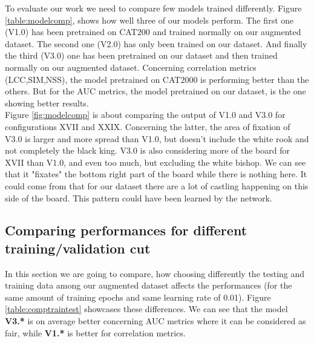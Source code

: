 To evaluate our work we need to compare few models trained differently. Figure \ref{table:modelcomp}, shows how well three of our models perform.
The first one (V1.0) has been pretrained on CAT200 and trained normally on our augmented dataset. The second one (V2.0) has only been trained on our dataset. And finally the third (V3.0) one has been pretrained on our dataset and then trained normally on our augmented dataset. Concerning correlation metrics (LCC,SIM,NSS), the model pretrained on CAT2000 is performing better than the others. But for the AUC metrics, the model pretrained on our dataset, is the one showing better results.\\



Figure \ref{fig:modelcomp} is about comparing the output of V1.0 and V3.0 for configurations XVII and XXIX. Concerning the latter, the area of fixation of V3.0 is larger and more spread than V1.0, but doesn't include the white rook and not completely the black king. V3.0 is also considering more of the board for XVII than V1.0, and even too much, but excluding the white bishop. We can see that it "fixates" the bottom right part of the board while there is nothing here. It could come from that for our dataset there are a lot of castling happening on this side of the board. This pattern could have been learned by the network.


\subsection{Comparing performances for different training/validation cut}

In this section we are going to compare, how choosing differently the testing and training data among our augmented dataset affects the performances (for the same amount of training epochs and same learning rate of 0.01). Figure \ref{table:comptraintest} showcases these differences. We can see that the model \textbf{V3.*} is on average better concerning AUC metrics where it can be considered as fair, while \textbf{V1.*} is better for correlation metrics.

